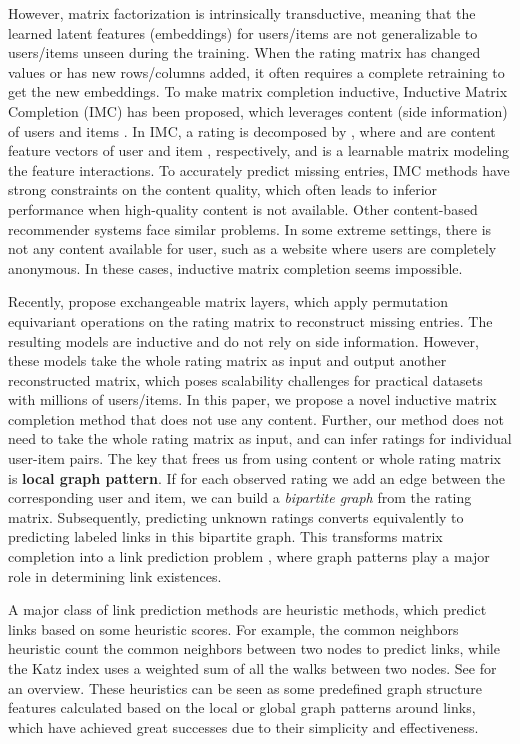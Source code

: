 \documentclass{article} \usepackage{iclr2020_conference,times}
\begin{document}
However, matrix factorization is intrinsically transductive, meaning that the learned latent features (embeddings) for users/items are not generalizable to users/items unseen during the training. When the rating matrix has changed values or has new rows/columns added, it often requires a complete retraining to get the new embeddings. To make matrix completion inductive, Inductive Matrix Completion (IMC) has been proposed, which leverages content (side information) of users and items \citep{jain2013provable,xu2013speedup}. In IMC, a rating is decomposed by , where  and  are content feature vectors of user  and item , respectively, and  is a learnable matrix modeling the feature interactions. To accurately predict missing entries, IMC methods have strong constraints on the content quality, which often leads to inferior performance when high-quality content is not available. Other content-based recommender systems \citep{lops2011content} face similar problems. In some extreme settings, there is not any content available for user, such as a website where users are completely anonymous. In these cases, inductive matrix completion seems impossible. 



Recently, \citet{hartford2018deep} propose exchangeable matrix layers, which apply permutation equivariant operations on the rating matrix to reconstruct missing entries. The resulting models are inductive and do not rely on side information. However, these models take the whole rating matrix  as input and output another reconstructed matrix, which poses scalability challenges for practical datasets with millions of users/items.
In this paper, we propose a novel inductive matrix completion method that does not use any content. Further, our method does not need to take the whole rating matrix as input, and can infer ratings for individual user-item pairs. The key that frees us from using content or whole rating matrix is \textbf{local graph pattern}.
If for each observed rating we add an edge between the corresponding user and item, we can build a \textit{bipartite graph} from the rating matrix. Subsequently, predicting unknown ratings converts equivalently to predicting labeled links in this bipartite graph. This transforms matrix completion into a link prediction problem \citep{liben2007link}, where graph patterns play a major role in determining link existences.

A major class of link prediction methods are heuristic methods, which predict links based on some heuristic scores. For example, the common neighbors heuristic count the common neighbors between two nodes to predict links, while the Katz index \citep{katz1953new} uses a weighted sum of all the walks between two nodes. See \citep{liben2007link} for an overview. These heuristics can be seen as some predefined graph structure features calculated based on the local or global graph patterns around links, which have achieved great successes due to their simplicity and effectiveness. 
\end{document}
